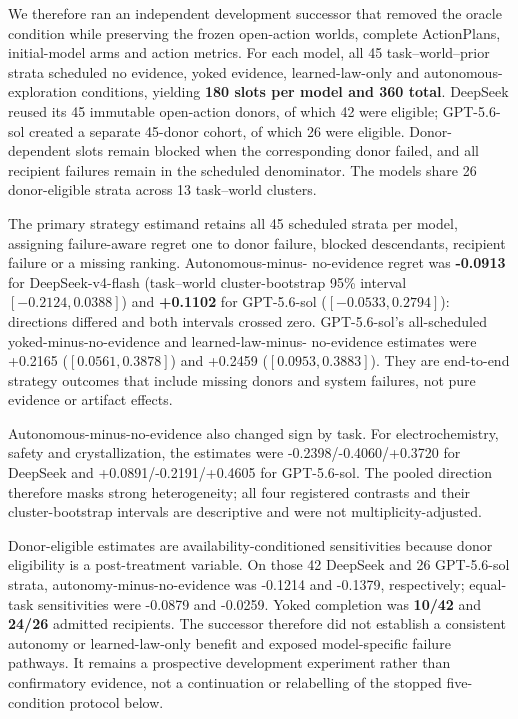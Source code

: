 \documentclass[10pt,twocolumn]{article}
\begin{document}
We therefore ran an independent development successor that removed the
oracle condition while preserving the frozen open-action worlds,
complete ActionPlans, initial-model arms and action metrics. For each
model, all 45 task--world--prior strata scheduled no evidence, yoked
evidence, learned-law-only and autonomous-exploration conditions,
yielding \textbf{180 slots per model and 360 total}. DeepSeek reused its
45 immutable open-action donors, of which 42 were eligible; GPT-5.6-sol
created a separate 45-donor cohort, of which 26 were eligible.
Donor-dependent slots remain blocked when the corresponding donor
failed, and all recipient failures remain in the scheduled denominator.
The models share 26 donor-eligible strata across 13 task--world
clusters.

The primary strategy estimand retains all 45 scheduled strata per model,
assigning failure-aware regret one to donor failure, blocked
descendants, recipient failure or a missing ranking. Autonomous-minus-
no-evidence regret was \textbf{-0.0913} for DeepSeek-v4-flash
(task--world cluster-bootstrap 95\% interval \([-0.2124,0.0388]\)) and
\textbf{+0.1102} for GPT-5.6-sol (\([-0.0533,0.2794]\)): directions
differed and both intervals crossed zero. GPT-5.6-sol's all-scheduled
yoked-minus-no-evidence and learned-law-minus- no-evidence estimates
were +0.2165 (\([0.0561,0.3878]\)) and +0.2459 (\([0.0953,0.3883]\)).
They are end-to-end strategy outcomes that include missing donors and
system failures, not pure evidence or artifact effects.

Autonomous-minus-no-evidence also changed sign by task. For
electrochemistry, safety and crystallization, the estimates were
-0.2398/-0.4060/+0.3720 for DeepSeek and +0.0891/-0.2191/+0.4605 for
GPT-5.6-sol. The pooled direction therefore masks strong heterogeneity;
all four registered contrasts and their cluster-bootstrap intervals are
descriptive and were not multiplicity-adjusted.

Donor-eligible estimates are availability-conditioned sensitivities
because donor eligibility is a post-treatment variable. On those 42
DeepSeek and 26 GPT-5.6-sol strata, autonomy-minus-no-evidence was
-0.1214 and -0.1379, respectively; equal-task sensitivities were -0.0879
and -0.0259. Yoked completion was \textbf{10/42} and \textbf{24/26}
admitted recipients. The successor therefore did not establish a
consistent autonomy or learned-law-only benefit and exposed
model-specific failure pathways. It remains a prospective development
experiment rather than confirmatory evidence, not a continuation or
relabelling of the stopped five-condition protocol below.
\end{document}
